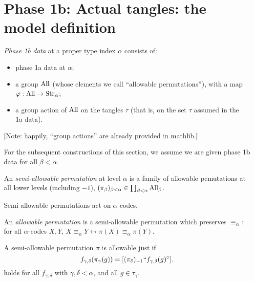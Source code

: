 \section{Phase 1b: Actual tangles: the model definition}

\begin{definition}
  \label{def:phase-1b-data}
  \leanok
  \emph{Phase 1b data} at a proper type index $\alpha$ consists of:
  \begin{itemize}
  \item phase 1a data at $\alpha$;
  \item a group $\mathrm{All}$ (whose elements we call “allowable permutations”), with a map $\varphi : \mathrm{All} \to \mathrm{Str}_\alpha$;
  \item a group action of $\mathrm{All}$ on the tangles $\tau$ (that is, on the set $\tau$ assumed in the 1a-data).
  \end{itemize}
  [Note: happily, “group actions” are already provided in mathlib.]

  For the subsequent constructions of this section, we assume we are given phase 1b data for all $\beta < \alpha$.
\end{definition}

\begin{definition}
\label {def:semiallowable-perm}
\leanok
{}
  An \emph{semi-allowable permutation} at level $\alpha$ is a family of allowable pemutations at all lower levels (including $-1$), $(\pi_\beta)_{\beta < \alpha} \in \prod_{\beta < \alpha} \mathrm{All}_\beta$.
\end{definition}

\begin{definition}
  \label{def:codes-action}
  Semi-allowable permutations act on $\alpha$-codes.
\end{definition}

\begin{definition}
  \label{def:allowable-perm}
  An \emph{allowable permutation} is a semi-allowable permutation which preserves $\equiv_\alpha$: for all $\alpha$-codes $X,Y$, $X \equiv_\alpha Y \leftrightarrow \pi(X) \equiv_\alpha \pi(Y)$.
\end{definition}

\begin{lemma}
\label {lem:coherence-unpacked}
A semi-allowable permutation $\pi$ is allowable just if
$$f_{\gamma,\delta}(\pi_\gamma(g)) = [(\pi_\delta)_{-1}``f_{\gamma,\delta}(g)^\circ].$$
holds for all $f_{\gamma,\delta}$ with $\gamma,\delta<\alpha$, and all $g \in \tau_\gamma$.
\end{lemma}

